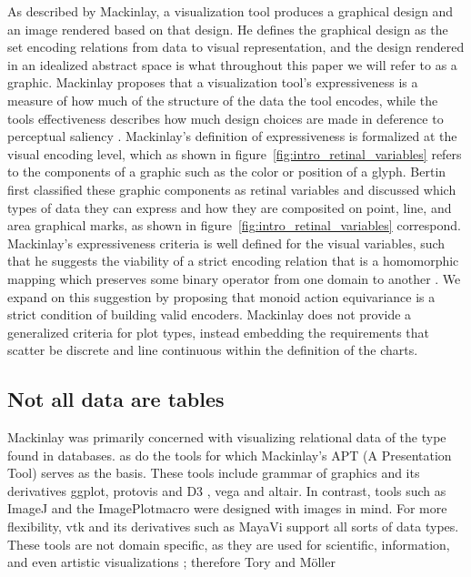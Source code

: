\documentclass[../main.tex]{subfiles}
\begin{document}
As described by Mackinlay, a visualization tool produces a graphical design and an image rendered based on that design. He defines the graphical design as the set encoding relations from data to visual representation\cite{mackinlayAutomatingDesignGraphical1986}, and the design rendered in an idealized abstract space is what throughout this paper we will refer to as a graphic. Mackinlay  proposes that a visualization tool's expressiveness is a measure of how much of the structure of the data the tool encodes, while the tools effectiveness describes how much design choices are made in deference to perceptual saliency \cite{clevelandResearchStatisticalGraphics1987,clevelandGraphicalPerceptionTheory1984,chambersGraphicalMethodsData1983a, munznerVisualizationAnalysisDesign2014}. Mackinlay's definition of expressiveness is formalized at the visual encoding level, which as shown in figure~\ref{fig:intro_retinal_variables} refers to the components of a graphic such as the color or position of a glyph. Bertin first classified these graphic components as retinal variables and discussed which types of data they can express \cite{bertinIIPropertiesGraphic2011} and how they are composited on point, line, and area graphical marks, as shown in figure~\ref{fig:intro_retinal_variables} correspond. Mackinlay's expressiveness criteria is well defined for the visual variables, such that he suggests the viability of a strict encoding relation that is a homomorphic mapping which preserves some binary operator from one domain to another \cite{mackinlayAUTOMATICDESIGNGRAPHICAL1987}. We expand on this suggestion by proposing that monoid action equivariance is a strict condition of building valid encoders. Mackinlay does not provide a generalized criteria for plot types, instead embedding the requirements that scatter be discrete and line continuous within the definition of the charts. 



\subsection{Not all data are tables}

Mackinlay was primarily concerned with visualizing relational data of the type found in databases. as do the tools for which Mackinlay's APT (A Presentation Tool) serves as the basis. These tools include grammar of graphics \cite{wilkinsonGrammarGraphics2005} and its derivatives ggplot\cite{wickhamGgplot2ElegantGraphics2016a}, protovis\cite{bostockProtoviz2009} and D3 \cite{bostockDataDrivenDocuments2011}, vega\cite{satyanarayanDeclarativeInteractionDesign2014} and altair\cite{vanderplasAltairInteractiveStatistical2018}. In contrast, tools such as ImageJ\cite{schneiderNIHImageImageJ2012} and the ImagePlot\cite{studiesCulturevisImageplot2021}macro were designed with images in mind. For more flexibility, vtk\cite{hanwellVisualizationToolkitVTK2015,geveci2012vtk} and its derivatives such as  MayaVi\cite{ramachandranMayaVi2011} support all sorts of data types. These tools are not domain specific, as they are used for scientific, information, and even artistic visualizations \cite{pousmanCasualInformation2007}; therefore Tory and Möller
\end{document}
